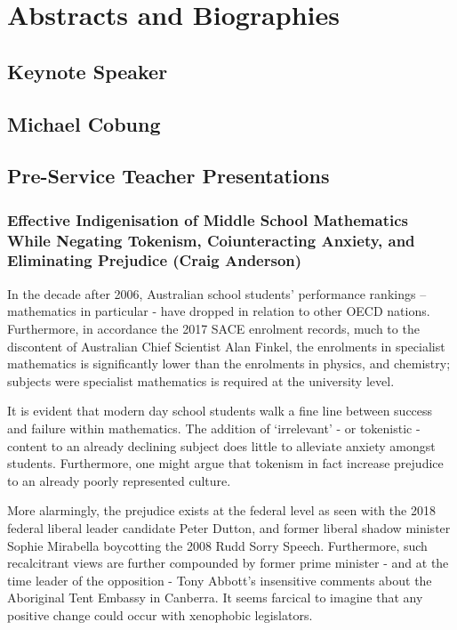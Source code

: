 \documentclass[twoside,14pt,a4paper,notitlepage]{memoir}
\begin{document}
\chapter*{Abstracts and Biographies}

\section*{Keynote Speaker}


\section*{Michael Cobung}



\pagebreak
\section*{Pre-Service Teacher Presentations}




\subsection*{Effective Indigenisation of Middle School Mathematics While Negating Tokenism, Coiunteracting Anxiety, and Eliminating Prejudice (Craig Anderson)}

In the decade after 2006, Australian school students’ performance rankings – mathematics in particular - have dropped in relation to other OECD nations. Furthermore, in accordance the 2017 SACE enrolment records, much to the discontent of Australian Chief Scientist Alan Finkel, the enrolments in specialist mathematics is significantly lower than the enrolments in physics, and chemistry; subjects were specialist mathematics is required at the university level.
 
It is evident that modern day school students walk a fine line between success and failure within mathematics. The addition of ‘irrelevant’ - or tokenistic - content to an already declining subject does little to alleviate anxiety amongst students. Furthermore, one might argue that tokenism in fact increase prejudice to an already poorly represented culture.
 
More alarmingly, the prejudice exists at the federal level as seen with the 2018 federal liberal leader candidate Peter Dutton, and former liberal shadow minister Sophie Mirabella boycotting the 2008 Rudd Sorry Speech. Furthermore, such recalcitrant views are further compounded by former prime minister - and at the time leader of the opposition - Tony Abbott’s insensitive comments about the Aboriginal Tent Embassy in Canberra. It seems farcical to imagine that any positive change could occur with xenophobic legislators.
 
\end{document}
